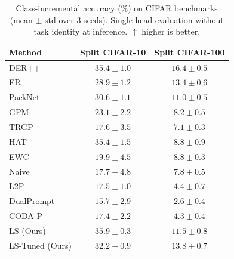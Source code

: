 \begin{table}[t]
\centering
\caption{Class-incremental accuracy (\%) on CIFAR benchmarks (mean $\pm$ std over 3 seeds). Single-head evaluation without task identity at inference. $\uparrow$ higher is better.}
\label{tab:ci}
\small
\begin{tabular}{lcc}
\toprule
Method & Split CIFAR-10 & Split CIFAR-100 \\
\midrule
DER++ & $35.4 \pm 1.0$ & $\mathbf{16.4} \pm 0.5$ \\
ER & $28.9 \pm 1.2$ & $13.4 \pm 0.6$ \\
PackNet & $30.6 \pm 1.1$ & $11.0 \pm 0.5$ \\
GPM & $23.1 \pm 2.2$ & $8.2 \pm 0.5$ \\
TRGP & $17.6 \pm 3.5$ & $7.1 \pm 0.3$ \\
HAT & $35.4 \pm 1.5$ & $8.8 \pm 0.9$ \\
EWC & $19.9 \pm 4.5$ & $8.8 \pm 0.3$ \\
Naive & $17.7 \pm 4.8$ & $7.8 \pm 0.5$ \\
\midrule
L2P & $17.5 \pm 1.0$ & $4.4 \pm 0.7$ \\
DualPrompt & $15.7 \pm 2.9$ & $2.6 \pm 0.4$ \\
CODA-P & $17.4 \pm 2.2$ & $4.3 \pm 0.4$ \\
\midrule
LS (Ours) & $\mathbf{35.9} \pm 0.3$ & $11.5 \pm 0.8$ \\
LS-Tuned (Ours) & $32.2 \pm 0.9$ & $13.8 \pm 0.7$ \\
\bottomrule
\end{tabular}
\end{table}
